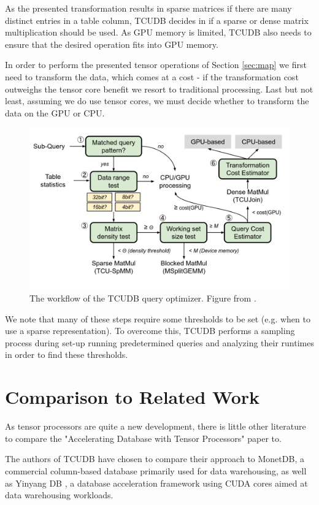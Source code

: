 \documentclass{paper}
\begin{document}
	As the presented transformation results in sparse matrices if there are many distinct entries in a table column, TCUDB decides in  if a sparse or dense matrix multiplication should be used. As GPU memory is limited, TCUDB also needs to ensure that  the desired operation fits into GPU memory.
	
	In order to perform the presented tensor operations of Section \ref{sec:map} we first need to transform the data, which comes at a cost - if the transformation cost outweighs the tensor core benefit  we resort to traditional processing. Last but not least, assuming we do use tensor cores, we must decide  whether to transform the data on the GPU or CPU.
	
	\begin{figure}
		\centering
		\includegraphics[width=0.9\linewidth]{pipeline}
		\caption{The workflow of the TCUDB query optimizer. Figure from \cite{hu2021tcudb}.} 
		\label{fig:pipeline}
	\end{figure}
	
	We note that many of these steps require some thresholds to be set (e.g. when to use a sparse representation). To overcome this, TCUDB performs a sampling process during set-up running predetermined queries and analyzing their runtimes in order to find these thresholds.
	
	\section{Comparison to Related Work} \label{sec:rel_work}
	As tensor processors are quite a new development, there is little other literature to compare the "Accelerating Database with Tensor Processors" paper to. 
	
	The authors of TCUDB have chosen to compare their approach to MonetDB, a commercial column-based database primarily used for data warehousing, as well as  Yinyang DB \cite{yuan2013yin}, a database acceleration framework using CUDA cores aimed at data warehousing workloads. 
	
\end{document}
